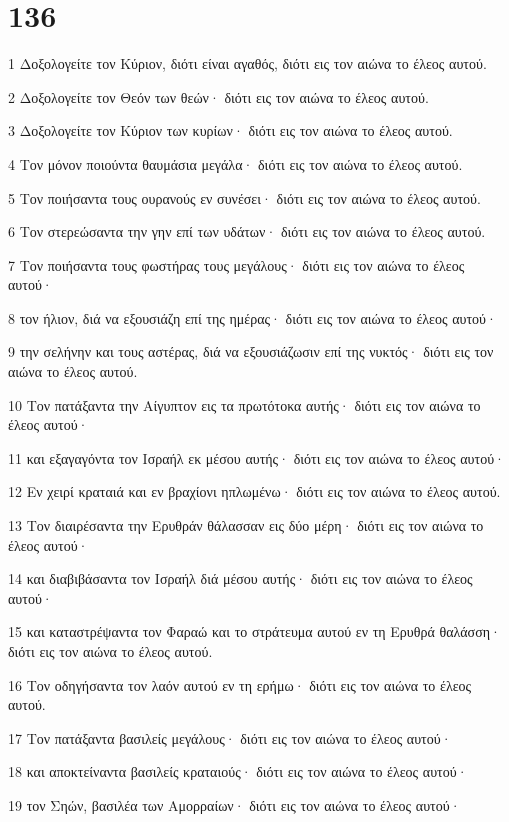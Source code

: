 \chapter{136}

\par 1 Δοξολογείτε τον Κύριον, διότι είναι αγαθός, διότι εις τον αιώνα το έλεος αυτού.
\par 2 Δοξολογείτε τον Θεόν των θεών· διότι εις τον αιώνα το έλεος αυτού.
\par 3 Δοξολογείτε τον Κύριον των κυρίων· διότι εις τον αιώνα το έλεος αυτού.
\par 4 Τον μόνον ποιούντα θαυμάσια μεγάλα· διότι εις τον αιώνα το έλεος αυτού.
\par 5 Τον ποιήσαντα τους ουρανούς εν συνέσει· διότι εις τον αιώνα το έλεος αυτού.
\par 6 Τον στερεώσαντα την γην επί των υδάτων· διότι εις τον αιώνα το έλεος αυτού.
\par 7 Τον ποιήσαντα τους φωστήρας τους μεγάλους· διότι εις τον αιώνα το έλεος αυτού·
\par 8 τον ήλιον, διά να εξουσιάζη επί της ημέρας· διότι εις τον αιώνα το έλεος αυτού·
\par 9 την σελήνην και τους αστέρας, διά να εξουσιάζωσιν επί της νυκτός· διότι εις τον αιώνα το έλεος αυτού.
\par 10 Τον πατάξαντα την Αίγυπτον εις τα πρωτότοκα αυτής· διότι εις τον αιώνα το έλεος αυτού·
\par 11 και εξαγαγόντα τον Ισραήλ εκ μέσου αυτής· διότι εις τον αιώνα το έλεος αυτού·
\par 12 Εν χειρί κραταιά και εν βραχίονι ηπλωμένω· διότι εις τον αιώνα το έλεος αυτού.
\par 13 Τον διαιρέσαντα την Ερυθράν θάλασσαν εις δύο μέρη· διότι εις τον αιώνα το έλεος αυτού·
\par 14 και διαβιβάσαντα τον Ισραήλ διά μέσου αυτής· διότι εις τον αιώνα το έλεος αυτού·
\par 15 και καταστρέψαντα τον Φαραώ και το στράτευμα αυτού εν τη Ερυθρά θαλάσση· διότι εις τον αιώνα το έλεος αυτού.
\par 16 Τον οδηγήσαντα τον λαόν αυτού εν τη ερήμω· διότι εις τον αιώνα το έλεος αυτού.
\par 17 Τον πατάξαντα βασιλείς μεγάλους· διότι εις τον αιώνα το έλεος αυτού·
\par 18 και αποκτείναντα βασιλείς κραταιούς· διότι εις τον αιώνα το έλεος αυτού·
\par 19 τον Σηών, βασιλέα των Αμορραίων· διότι εις τον αιώνα το έλεος αυτού·

